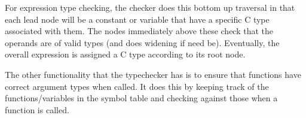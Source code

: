 For expression type checking, the checker does this bottom up traversal in that
each lead node will be a constant or variable that have a specific C type
associated with them. The nodes immediately above these check that the operands
are of valid types (and does widening if need be). Eventually, the overall
expression is assigned a C type according to its root node.

The other functionality that the typechecker has is to ensure that functions
have correct argument types when called. It does this by keeping track of the
functions/variables in the symbol table and checking against those when a
function is called.